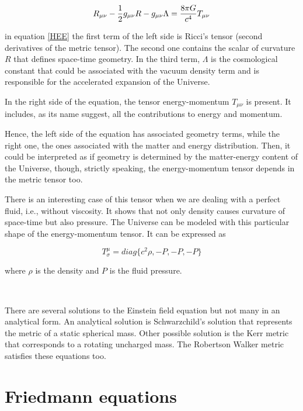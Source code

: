 \begin{equation}
R_{\mu\nu}-\frac{1}{2}g_{\mu\nu}R-g_{\mu\nu}\Lambda = \frac{8\pi G}{c^4}T_{\mu\nu}
\label{HEE}
\end{equation}

in equation \ref{HEE} the first term of the left side is Ricci's tensor 
(second derivatives of the metric tensor). 
The second one contains the scalar of curvature $R$ that defines space-time geometry. 
In the third term, $\Lambda$ is the cosmological constant that could be associated with
the vacuum density term and is responsible for the accelerated expansion of the Universe.  

In the right side of the equation, the tensor energy-momentum $T_{\mu\nu}$ is present.
It includes, as its name suggest, all the contributions to energy and momentum. 

Hence, the left side of the equation has associated geometry terms, 
while the right one, the ones associated with the matter and energy distribution. 
Then, it could be interpreted as if geometry is determined by the matter-energy content 
of the Universe, though, strictly speaking, the energy-momentum tensor depends
in the metric tensor too. 

There is an interesting case of this tensor when we are dealing with a perfect 
fluid, i.e., without viscosity. It shows that not only density causes curvature of space-time 
but also pressure. The Universe can be modeled with this particular
shape of the energy-momentum tensor. It can be expressed as 

\[T^{\mu}_{\sigma}= diag\{c^2\rho,-P,-P,-P\}\]

where $\rho$ is the density and $P$ is the fluid pressure. 

\

There are several solutions to the Einstein field equation but not
many in an analytical form. An analytical solution is Schwarzchild's solution that 
represents the metric of a static spherical mass. Other possible solution is the Kerr 
metric that corresponds to a rotating uncharged mass. The Robertson
Walker metric satisfies these equations too. 
	

\section{ Friedmann equations }


